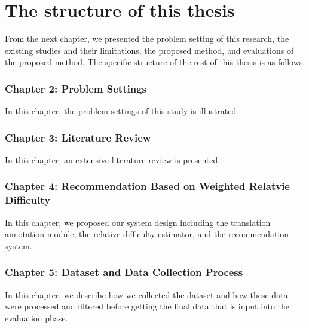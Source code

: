 
\clearpage
\section{The structure of this thesis}

From the next chapter, we presented the problem setting of this research, the existing studies and their limitations, the proposed method, and evaluations of the proposed method. The specific structure of the rest of this thesis is as follows.

\subsubsection{Chapter 2: Problem Settings}
\vspace{10pt}
In this chapter, the problem settings of this study is illustrated

\subsubsection{Chapter 3: Literature Review}
\vspace{10pt}
In this chapter, an extensive literature review is presented. 

\subsubsection{Chapter 4: Recommendation Based on Weighted Relatvie Difficulty}
\vspace{10pt}
In this chapter, we proposed our system design including the translation annotation module, the relative difficulty estimator, and the recommendation system.

\subsubsection{Chapter 5: Dataset and Data Collection Process}
\vspace{10pt}
In this chapter, we describe how we collected the dataset and how these data were processed and filtered before getting the final data that is input into the evaluation phase.

